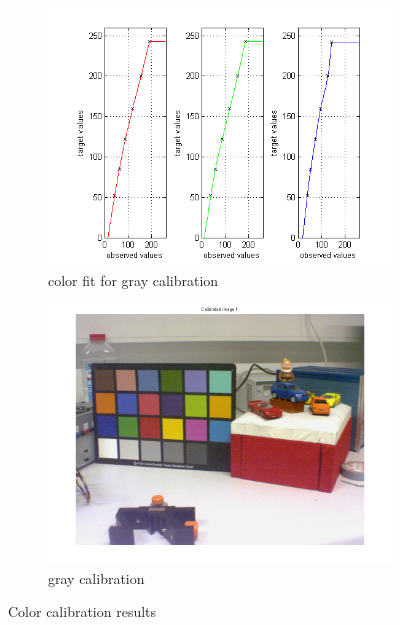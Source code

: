 \documentclass[
a4paper,     %
11pt         %
]{scrartcl}  %
\begin{document}
\begin{figure}[ht!]
\begin{subfigure}{0.49\textwidth}
  \centering
  \includegraphics[width=\textwidth]{./Bildg_Messtechnik_Lab/ColorCalibration/html/color_calibration_03.png}
  \caption{color fit for gray calibration} \label{fig:colCal_pict2}
\end{subfigure}%
\begin{subfigure}{0.49\textwidth}
  \centering
  \includegraphics[width=\textwidth]{./Bildg_Messtechnik_Lab/ColorCalibration/html/color_calibration_04.png}
  \caption{gray calibration} \label{fig:colCal_pict3}
\end{subfigure}
\caption{Color calibration results}
\label{fig:colCal_pict}
\end{figure}
\end{document}

